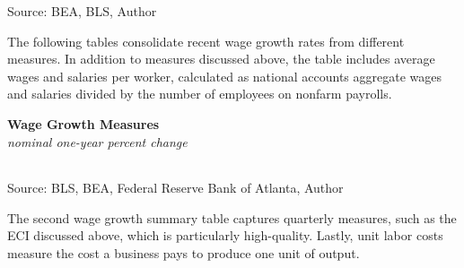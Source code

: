 \documentclass{report}
\newcommand{\tbllink}[1]{\href{https://raw.githubusercontent.com/bdecon/US-chartbook/master/chartbook/data/#1}{\faTable}}
\begin{document}
{\begin{minipage}{0.335\textwidth}
\footnotesize{Source: BEA, BLS, Author} \hfill \tbllink{wages_yy_monthly.csv} \  \tbllink{wages_yy_quarterly.csv} 
\end{minipage}
\vspace{1mm}

\begin{minipage}{0.76\textwidth}
\small The following tables consolidate recent wage growth rates from different measures. In addition to measures discussed above, the table includes average wages and salaries per worker, calculated as national accounts aggregate wages and salaries divided by the number of employees on nonfarm payrolls. 
\vspace{0.5mm}

\normalsize \textbf{Wage Growth Measures}\\
\footnotesize{\textit{nominal one-year percent change}}
\vspace*{-8mm}

 \setlength{\tabcolsep}{2.2pt} \color{black!90}
{\renewcommand{\arraystretch}{1.5}
\hspace{-1mm} \begin{tabular}{p{48.5mm} R{7.0mm} R{7.0mm} R{7.0mm} R{7.0mm} R{7.0mm} 
		R{7.0mm} R{7.0mm} R{7.0mm} }
 \hline
	\end{tabular}}
	\vspace{-1.5mm}
				
\footnotesize{Source: BLS, BEA, Federal Reserve Bank of Atlanta, Author} \hfill \tbllink{wages_yy_monthly.csv} 
\end{minipage}
\newpage
\vspace*{-10mm}   

\begin{minipage}{0.76\textwidth}
\small The second wage growth summary table captures quarterly measures, such as the ECI discussed above, which is particularly high-quality. Lastly, unit labor costs measure the cost a business pays to produce one unit of output. 
\vspace{0.5mm}


\end{minipage}}
\end{document}
